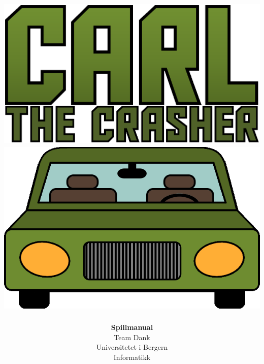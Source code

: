 \documentclass[paper=a4]{article}
\begin{document}
\title{ \normalsize \includegraphics[scale=0.43]{images/CarGameLogo.png}
	\\
	\includegraphics[scale=0.5]{images/menu_car.png}
}
\author{\textbf{Spillmanual} \\
Team Dank \\
Universitetet i Bergern \\
Informatikk}
\maketitle
\newpage

\tableofcontents
\newpage
\end{document}
